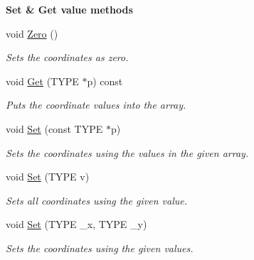 \begin{Indent}\textbf{ Set \& Get value methods}\par
\begin{DoxyCompactItemize}
\item 
\mbox{\label{classcy_1_1_point2_a4d9c5430e50096a56041b24f093ace80}} 
void \mbox{\hyperlink{classcy_1_1_point2_a4d9c5430e50096a56041b24f093ace80}{Zero}} ()
\begin{DoxyCompactList}\small\item\em Sets the coordinates as zero. \end{DoxyCompactList}\item 
\mbox{\label{classcy_1_1_point2_a2bc886ab0ae873d9a05ffd62edf3f75e}} 
void \mbox{\hyperlink{classcy_1_1_point2_a2bc886ab0ae873d9a05ffd62edf3f75e}{Get}} (T\+Y\+PE $\ast$p) const
\begin{DoxyCompactList}\small\item\em Puts the coordinate values into the array. \end{DoxyCompactList}\item 
\mbox{\label{classcy_1_1_point2_af09f598f45b3e276b0540f4d4d9fe2b4}} 
void \mbox{\hyperlink{classcy_1_1_point2_af09f598f45b3e276b0540f4d4d9fe2b4}{Set}} (const T\+Y\+PE $\ast$p)
\begin{DoxyCompactList}\small\item\em Sets the coordinates using the values in the given array. \end{DoxyCompactList}\item 
\mbox{\label{classcy_1_1_point2_ab171fde1e0c637bcbe56a3602e6481e3}} 
void \mbox{\hyperlink{classcy_1_1_point2_ab171fde1e0c637bcbe56a3602e6481e3}{Set}} (T\+Y\+PE v)
\begin{DoxyCompactList}\small\item\em Sets all coordinates using the given value. \end{DoxyCompactList}\item 
\mbox{\label{classcy_1_1_point2_aafbe4a63bcddc322ced5be2d23a0e462}} 
void \mbox{\hyperlink{classcy_1_1_point2_aafbe4a63bcddc322ced5be2d23a0e462}{Set}} (T\+Y\+PE \+\_\+x, T\+Y\+PE \+\_\+y)
\begin{DoxyCompactList}\small\item\em Sets the coordinates using the given values. \end{DoxyCompactList}\end{DoxyCompactItemize}
\end{Indent}
